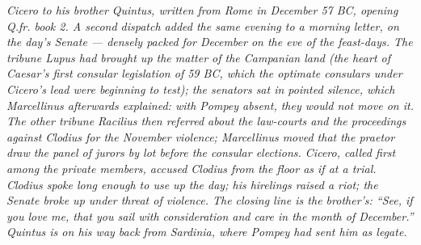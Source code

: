 
\textit{Cicero to his brother Quintus, written from Rome in
December 57 BC, opening Q.fr. book 2. A second dispatch added
the same evening to a morning letter, on the day's Senate ---
densely packed for December on the eve of the feast-days. The
tribune Lupus had brought up the matter of the Campanian
land (the heart of Caesar's first consular legislation of 59
BC, which the optimate consulars under Cicero's lead were
beginning to test); the senators sat in pointed silence,
which Marcellinus afterwards explained: with Pompey absent,
they would not move on it. The other tribune Racilius then
referred about the law-courts and the proceedings against
Clodius for the November violence; Marcellinus moved that
the praetor draw the panel of jurors by lot before the
consular elections. Cicero, called first among the private
members, accused Clodius from the floor as if at a trial.
Clodius spoke long enough to use up the day; his hirelings
raised a riot; the Senate broke up under threat of violence.
The closing line is the brother's: ``See, if you love me,
that you sail with consideration and care in the month of
December.'' Quintus is on his way back from Sardinia, where
Pompey had sent him as legate.}
